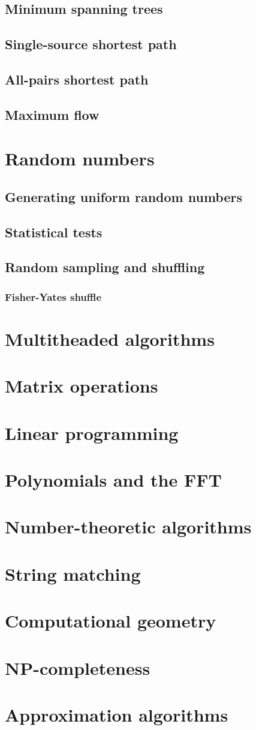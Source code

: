 \subsection{Minimum spanning trees}
\subsection{Single-source shortest path}
\subsection{All-pairs shortest path}
\subsection{Maximum flow}
\section{Random numbers}
\subsection{Generating uniform random numbers}
\subsection{Statistical tests}
\subsection{Random sampling and shuffling}
\subsubsection{Fisher-Yates shuffle}
\section{Multitheaded algorithms}
\section{Matrix operations}
\section{Linear programming}
\section{Polynomials and the FFT}
\section{Number-theoretic algorithms}
\section{String matching}
\section{Computational geometry}
\section{NP-completeness}
\section{Approximation algorithms}